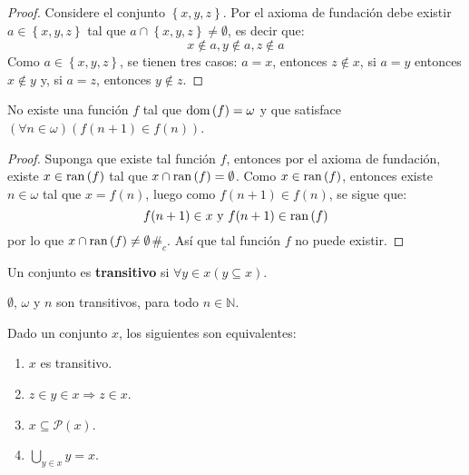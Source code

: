 \documentclass[12pt]{report}
\newcounter{it}
\theoremstyle{largebreak}
\newcommand\contradiction{\ensuremath{\#_c}}
\newcommand\pot[1]{\ensuremath{\mathcal{P}\left(#1\right)}}
\newcommand\dom[1]{\ensuremath{\textup{dom}\left(#1\right)}}
\newcommand\ran[1]{\ensuremath{\textup{ran}\left(#1\right)}}
\begin{document}
    \begin{proof}
        Considere el conjunto $\left\{x,y,z\right\}$. Por el axioma de fundación debe existir $a\in\left\{x,y,z\right\}$ tal que $a\cap\left\{x,y,z \right\}\neq\emptyset$, es decir que:
        \begin{equation*}
            x\notin a,y\notin a,z\notin a
        \end{equation*}
        Como $a\in\left\{x,y,z\right\}$, se tienen tres casos: $a=x$, entonces $z\notin x$, si $a=y$ entonces $x\notin y$ y, si $a=z$, entonces $y\notin z$.
    \end{proof}

    \begin{propo}
        No existe una función $f$ tal que $\dom{f}=\omega$ y que satisface $(\forall n\in\omega)(f(n+1)\in f(n))$.
    \end{propo}

    \begin{proof}
        Suponga que existe tal función $f$, entonces por el axioma de fundación, existe $x\in\ran{f}$ tal que $x\cap\ran{f}=\emptyset$. Como $x\in\ran{f}$, entonces existe $n\in\omega$ tal que $x=f(n)$, luego como $f(n+1)\in f(n)$, se sigue que:
        \begin{equation*}
            f(n+1)\in x\textup{ y }f(n+1)\in\ran{f}
        \end{equation*}
        por lo que $x\cap\ran{f}\neq\emptyset$\contradiction. Así que tal función $f$ no puede existir.
    \end{proof}

    \begin{mydef}
        Un conjunto es \textbf{transitivo} si $\forall y\in x(y\subseteq x)$.
    \end{mydef}

    \begin{exa}
        $\emptyset$, $\omega$ y $n$ son transitivos, para todo $n\in\mathbb{N}$.
    \end{exa}

    \begin{propo}
        Dado un conjunto $x$, los siguientes son equivalentes:
        \begin{enumerate}[label = \textit{(\arabic*)}]
            \item $x$ es transitivo.
            \item $z\in y\in x \Rightarrow z\in x$.
            \item $x\subseteq\pot{x}$.
            \item $\bigcup_{y\in x}y=x$.
        \end{enumerate}
    \end{propo}
\end{document}
